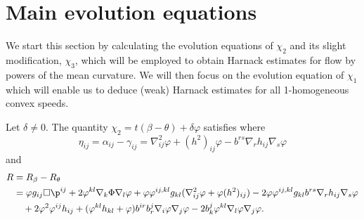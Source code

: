 \documentclass[12pt]{amsart}
\begin{document}
\section{Main evolution equations}
We start this section by calculating the evolution equations of $\chi_2$ and its slight modification, $\chi_3$, which will be employed to obtain Harnack estimates for flow by powers of the mean curvature. We will then focus on the evolution equation of $\chi_1$ which will enable us to deduce (weak) Harnack estimates for all 1-homogeneous convex speeds.
\begin{lemma}
\label{thm:Evchi}
Let $\delta \neq 0.$ The quantity
$
\chi_2 = t(\beta - \theta) + \delta\varphi
$
satisfies
where
\[
\eta_{ij} = \alpha_{ij} - \gamma_{ij} = \nabla^2_{ij}\varphi + (h^2)_{ij}\varphi - b^{rs}\nabla_r h_{ij}\nabla_s \varphi
\]
and
\[
\begin{split}
R &= R_{\beta} - R_{\theta} \\
&= \varphi g_{ij} \Box \p^{ij} + 2\varphi^{kl} \nabla_k \Phi \nabla_l \varphi + \varphi \varphi^{ij,kl}g_{kl} (\nabla^2_{ij} \varphi + \varphi(h^2)_{ij}) - 2\varphi \varphi^{ij,kl}g_{kl} b^{rs}\nabla_r h_{ij}\nabla_s \varphi \\
&\quad + 2\varphi^{2}\varphi^{ij}h_{ij} +(\varphi^{kl}h_{kl} + \varphi)b^{ir}b^{j}_{r}\nabla_i \varphi\nabla_j\varphi - 2 b^{j}_{k}\varphi^{kl}\nabla_l\varphi\nabla_j\varphi.
\end{split}
\]

\end{lemma}
\end{document}
